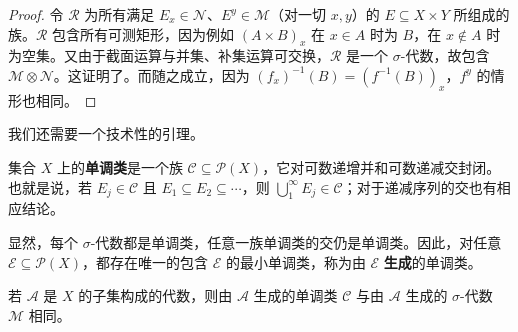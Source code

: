 \documentclass[../../main.tex]{subfiles}%
\begin{document}
\begin{proof}
令 $\mathscr{R}$ 为所有满足 $E_x\in\mathscr{N}$、$E^y\in\mathscr{M}$（对一切 $x,y$）的 $E\subseteq X\times Y$ 所组成的族。$\mathscr{R}$ 包含所有可测矩形，因为例如 $(A\times B)_x$ 在 $x\in A$ 时为 $B$，在 $x\notin A$ 时为空集。又由于截面运算与并集、补集运算可交换，$\mathscr{R}$ 是一个 $\sigma$-代数，故包含 $\mathscr{M}\otimes\mathscr{N}$。这证明了。而随之成立，因为 $(f_x)^{-1}(B)=(f^{-1}(B))_x$，$f^y$ 的情形也相同。
\end{proof}
我们还需要一个技术性的引理。
\begin{definition}[单调类]\label{definition:ch02-monotone-class}
集合 $X$ 上的\textbf{单调类}是一个族 $\mathscr{C}\subseteq\mathscr{P}(X)$，它对可数递增并和可数递减交封闭。也就是说，若 $E_j\in\mathscr{C}$ 且 $E_1\subseteq E_2\subseteq\cdots$，则 $\bigcup_1^\infty E_j\in\mathscr{C}$；对于递减序列的交也有相应结论。
\end{definition}
\begin{definition}[生成的单调类]\label{definition:ch02-generated-monotone-class}
显然，每个 $\sigma$-代数都是单调类，任意一族单调类的交仍是单调类。因此，对任意 $\mathscr{E}\subseteq\mathscr{P}(X)$，都存在唯一的包含 $\mathscr{E}$ 的最小单调类，称为由 $\mathscr{E}$ \textbf{生成}的单调类。
\end{definition}
\begin{lemma}[单调类引理]\label{lemma:ch02-monotone-class}
若 $\mathscr{A}$ 是 $X$ 的子集构成的代数，则由 $\mathscr{A}$ 生成的单调类 $\mathscr{C}$ 与由 $\mathscr{A}$ 生成的 $\sigma$-代数 $\mathscr{M}$ 相同。
\end{lemma}
\end{document}
